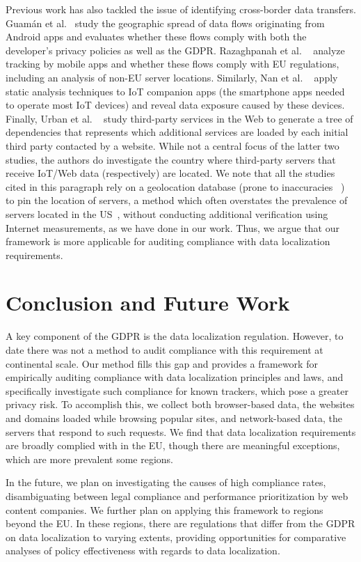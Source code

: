 Previous work has also tackled the issue of identifying cross-border data 
transfers. %
Guam{\'a}n et al.~\cite{9328756} study
the geographic spread of data flows originating from Android apps and evaluates
whether these flows comply with both the developer's privacy policies as
well as the GDPR. 
Razaghpanah et al. ~\cite{DBLP:conf/ndss/RazaghpanahNVSA18}
analyze tracking by mobile apps and whether these flows comply with
EU regulations, including an analysis of non-EU server locations.
Similarly, Nan et al. ~\cite{285453}
apply static analysis techniques to IoT companion apps (the smartphone apps needed to operate 
most IoT devices) and reveal data exposure caused by these devices.
Finally, Urban et al. ~\cite{10.1145/3366423.3380203} study third-party services in the
Web to generate a tree of dependencies that represents which additional services
are loaded by each initial third party contacted by a website.
While not a central focus of the latter two studies,
the authors do investigate the country where third-party servers that receive IoT/Web data (respectively) are located.
We note that all the studies cited in this paragraph rely on a geolocation
database (prone to inaccuracies ~\cite{10.1145/1971162.1971171, 10.1007/978-3-030-98785-5_6}) to pin the location of servers,
a method which often overstates the prevalence of servers located in the US~\cite{10.1145/3278532.3278561}, 
without conducting additional verification using Internet measurements,
as we have done in our work. Thus, we argue that our framework is more applicable
for auditing compliance with data localization requirements.



\section{Conclusion and Future Work}
A key component of the GDPR is the data localization regulation.
However, to date there was not a method to audit compliance
with this requirement at continental scale.
Our method fills this gap and provides a framework 
for empirically auditing compliance
with data localization principles and laws, and specifically investigate
such compliance for known trackers, which pose a greater privacy risk.
To accomplish this, we collect both browser-based data, the websites and 
domains loaded while browsing popular sites, and network-based data,
the servers that respond to such requests. We find that 
data localization requirements are broadly complied with in the EU,
though there are meaningful exceptions, which are more prevalent 
some regions. %

In the future, we plan on investigating the causes of high compliance rates,
disambiguating between legal compliance and performance prioritization by
web content companies. We further plan on applying this framework to regions
beyond the EU. In these regions, there are regulations that differ from the GDPR
on data localization to varying extents, providing opportunities for comparative
analyses of policy effectiveness with regards to data localization.


